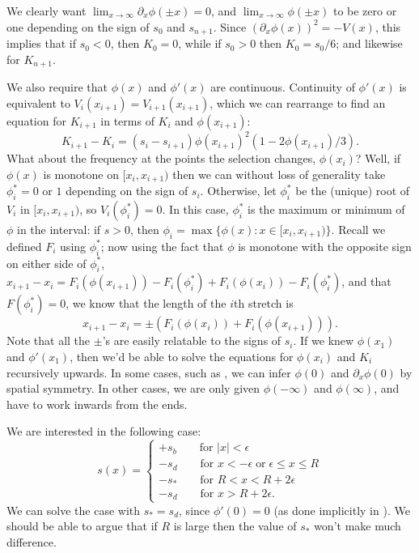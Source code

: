 \documentclass{article}
\begin{document}
We clearly want $\lim_{x \to \infty} \partial_x \phi(\pm x) = 0$, 
and $\lim_{x \to \infty} \phi(\pm x)$ to be zero or one depending on the sign of $s_0$ and $s_{n+1}$.
Since $(\partial_x \phi(x))^2 = -V(x)$, this implies that if $s_0<0$, then $K_0 = 0$,
while if $s_0>0$ then $K_0 = s_0/6$; and likewise for $K_{n+1}$.

We also require that $\phi(x)$ and $\phi'(x)$ are continuous.
Continuity of $\phi'(x)$ is equivalent to $V_i(x_{i+1}) = V_{i+1}(x_{i+1})$,
which we can rearrange to find an equation for $K_{i+1}$ in terms of $K_i$ and $\phi(x_{i+1})$:
\[
    K_{i+1} - K_i = (s_i - s_{i+1}) \phi(x_{i+1})^2 (1-2\phi(x_{i+1})/3) .
\]
What about the frequency at the points the selection changes, $\phi(x_i)$?  
Well, if $\phi(x)$ is monotone on $[x_i,x_{i+1})$ then we can without loss of generality take $\phi_i^*=0$ or $1$ depending on the sign of $s_i$.
Otherwise, let $\phi_i^*$ be the (unique) root of $V_i$ in $[x_i,x_{i+1})$, so $V_i(\phi_i^*)=0$.
In this case, $\phi_i^*$ is the maximum or minimum of $\phi$ in the interval:
if $s>0$, then $\phi_i = \max\{ \phi(x) : x \in [x_i,x_{i+1})\}$. 
Recall we defined $F_i$ using $\phi_i^*$; now using the fact that $\phi$ is monotone with the opposite sign on either side of $\phi_i^*$,
$x_{i+1} - x_i = F_i(\phi(x_{i+1})) - F_i(\phi_i^*) + F_i(\phi(x_{i})) - F_i(\phi_i^*)$,
and that $F(\phi_i^*) = 0$,
we know that the length of the $i$th stretch is
\[
    x_{i+1} - x_i = \pm \left( F_i(\phi(x_i)) + F_i(\phi(x_{i+1})) \right).
\]
Note that all the $\pm{}$'s are easily relatable to the signs of $s_i$.
If we knew $\phi(x_1)$ and $\phi'(x_1)$, then we'd be able to solve the equations for $\phi(x_i)$ and $K_i$ recursively upwards.
In some cases, such as \citet{slatkin1973geneflow}, we can infer $\phi(0)$ and $\partial_x \phi(0)$ by spatial symmetry.
In other cases, we are only given $\phi(-\infty)$ and $\phi(\infty)$, and have to work inwards from the ends.

We are interested in the following case:
\[
    s(x) = \begin{cases}
        +s_b \qquad \mbox{for } |x|<\epsilon \\
        -s_d \qquad \mbox{for } x<-\epsilon \; \mbox{or}\; \epsilon \le x \le R \\
        -s_* \qquad \mbox{for } R < x < R+2\epsilon \\
        -s_d \qquad \mbox{for } x>R+2\epsilon .
    \end{cases}
\]
We can solve the case with $s_* = s_d$, since $\phi'(0) = 0$ (as done implicitly in \citet{slatkin1973geneflow}).
We should be able to argue that if $R$ is large then the value of $s_*$ won't make much difference.
\end{document}

